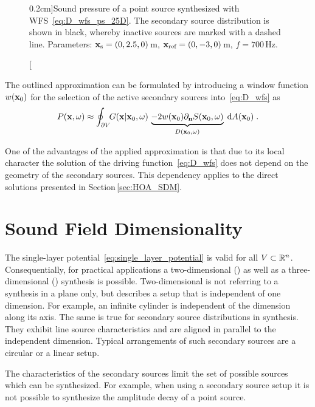 \begin{figure}
    \small
    \centering
    
    \caption[][0.2cm]{Sound pressure of a point source synthesized with
    \ac{WFS}~\protect\eqref{eq:D_wfs_ps_25D}. The secondary source
        distribution is shown in black, whereby inactive sources are marked with a
        dashed line. Parameters: $\mathbf{x}_\text{s} = (0,2.5,0)$\,m,
        $\mathbf{x}_\text{ref} = (0,-3,0)$\,m, $f = 700$\,Hz.
        }
    \label{fig:concave_array}
\end{figure}

The outlined approximation can be formulated by
introducing a window function $w(\mathbf{x}_0)$ for the selection of the active
secondary sources into~\eqref{eq:D_wfs} as
%
\begin{equation}
    P(\x,\omega) \approx \oint_{\partial V} \!\!  G(\x|\x_0,\omega) \,
    \underbrace{-2 w(\x_0) \partial_\n S(\x_0,\omega)}_{D(\x_0,\omega)} \; \D
    A(\x_0) \qp
    \label{eq:P_wfs}
\end{equation}
%

One of the advantages of the applied approximation is that due to its local
character the solution of the driving function~\eqref{eq:D_wfs} does not depend on
the geometry of the secondary sources. This dependency applies to the direct
solutions presented in Section\,\ref{sec:HOA_SDM}.


\section{Sound Field Dimensionality}
\label{sec:sound_field_dimensionality}
%
The single-layer potential~\eqref{eq:single_layer_potential} is valid for all $V
\subset \mathbb{R}^n$. Consequentially, for practical applications a two-dimensional
(\twoD) as well as a three-dimensional (\threeD) synthesis is possible.
Two-dimensional is not referring to a synthesis in a plane only, but describes a setup
that is independent of one dimension. For example, an infinite cylinder is
independent of the dimension along its axis. The same is true
for secondary source distributions in \twoD synthesis. They exhibit
line source characteristics and are aligned in parallel to
the independent dimension. Typical arrangements of such secondary sources are
a circular or a linear setup.

The characteristics of the secondary
sources limit the set of possible sources which can be synthesized. For example,
when using a \twoD secondary source setup it is not possible to synthesize the
amplitude decay of a point source.

